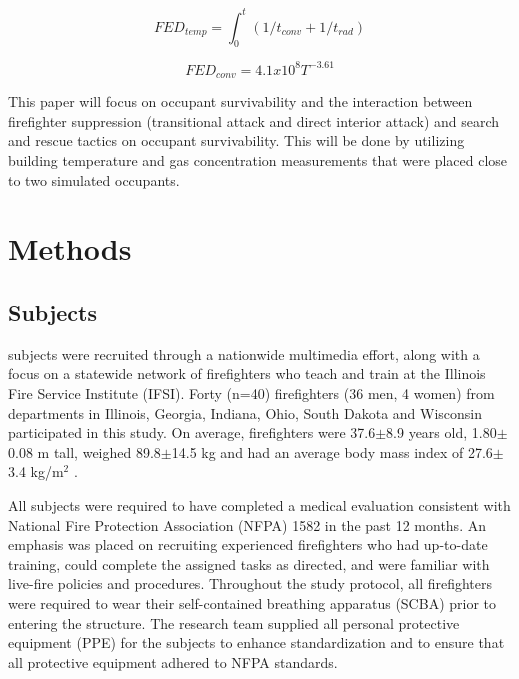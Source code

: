 \documentclass[12pt,oneside]{article}
\begin{document}


\begin{equation}\label{eqn:temp_cum}FED_{temp}=\int_{0}^{t}(1/t_{conv}+1/t_{rad})\end{equation}

\begin{equation}\label{eqn:FED_temp}FED_{conv}=4.1x10^8{T^{-3.61}}\end{equation}

This paper will focus on occupant survivability and the interaction between firefighter suppression (transitional attack and direct interior attack) and search and rescue tactics on occupant survivability.  This will be done by utilizing building temperature and gas concentration measurements that were placed close to two simulated occupants.  

\section{Methods}
\label{sec:methods}

\subsection{Subjects}
\label{subsec:subjects}

subjects were recruited through a nationwide multimedia effort, along with a focus on a statewide network of firefighters who teach and train at the Illinois Fire Service Institute (IFSI). Forty (n=40) firefighters (36 men, 4 women) from departments in Illinois, Georgia, Indiana, Ohio, South Dakota and Wisconsin participated in this study. On average, firefighters were 37.6$\pm$8.9 years old, 1.80$\pm$0.08 m tall, weighed 89.8$\pm$14.5 kg and had an average body mass index  of 27.6$\pm$3.4 kg/m$^2$ \cite{Horn:Ergonomics}.

All subjects were required to have completed a medical evaluation consistent with National Fire Protection Association (NFPA) 1582 \cite{NFPA_1582} in the past 12 months. An emphasis was placed on recruiting  experienced firefighters who had up-to-date training, could complete the assigned tasks as directed, and were familiar with live-fire policies and procedures. Throughout the study protocol, all firefighters were required to wear their self-contained breathing apparatus (SCBA) prior to entering the structure. The research team supplied all personal protective equipment (PPE) for the subjects to enhance standardization and to ensure that all protective equipment adhered to NFPA standards.
\end{document}
